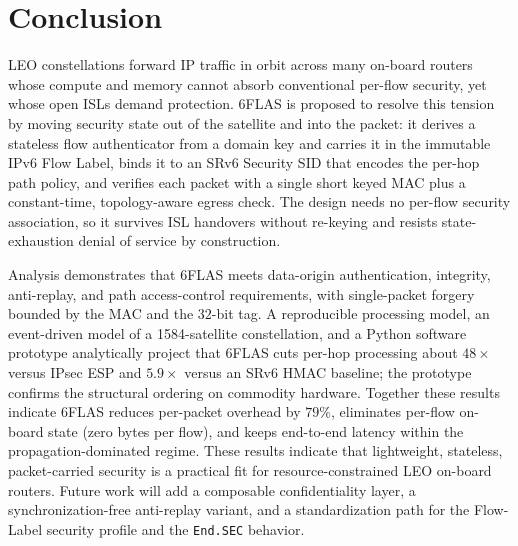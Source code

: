 \section{Conclusion}
\label{sec:conclusion}

LEO constellations forward IP traffic in orbit across many on-board routers
whose compute and memory cannot absorb conventional per-flow security, yet whose
open ISLs demand protection. 6FLAS is proposed to resolve this tension by
moving security state out of the satellite and into the packet: it derives a
stateless flow authenticator from a domain key and carries it in the immutable
IPv6 Flow Label, binds it to an SRv6 Security SID that encodes the per-hop path
policy, and verifies each packet with a single short keyed MAC plus a constant-time,
topology-aware egress check. The design needs no per-flow security association,
so it survives ISL handovers without re-keying and resists state-exhaustion
denial of service by construction.

Analysis demonstrates that 6FLAS meets data-origin authentication, integrity,
anti-replay, and path access-control requirements, with single-packet forgery
bounded by the MAC and the $32$-bit tag. A reproducible processing model, an
event-driven model of a 1584-satellite constellation, and a Python software
prototype analytically project that 6FLAS cuts per-hop processing about
$48\times$ versus IPsec ESP and $5.9\times$ versus an SRv6 HMAC baseline; the
prototype confirms the structural ordering on commodity hardware. Together these
results indicate 6FLAS reduces per-packet overhead by $79\%$, eliminates
per-flow on-board state (zero bytes per flow), and keeps end-to-end latency
within the propagation-dominated regime. These
results indicate that lightweight, stateless, packet-carried security is a
practical fit for resource-constrained LEO on-board routers. Future work will
add a composable confidentiality layer, a synchronization-free anti-replay
variant, and a standardization path for the Flow-Label security profile and the
\texttt{End.SEC} behavior.
